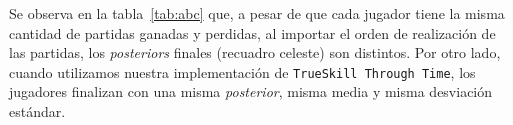 \documentclass[11pt,twoside,spanish]{report} %
\begin{document}
\begin{table}[H]
\centering
{}
\caption{\textit{Posteriors} de tres partidas utilizando \texttt{TrueSkill} con jugadores inicializados con una media de $25$ y una incertidumbre de $6$. Se recuadra en celeste el \textit{posterior} final de cada jugador.}
\label{tab:abc}
\end{table}

Se observa en la tabla~\ref{tab:abc} que, a pesar de que cada jugador tiene la misma cantidad de partidas ganadas y perdidas, al importar el orden de realizaci\'on de las partidas, los \textit{posteriors} finales (recuadro celeste) son distintos.
Por otro lado, cuando utilizamos nuestra implementaci\'on de \texttt{TrueSkill Through Time}, los jugadores finalizan con una misma \textit{posterior}, misma media y misma desviaci\'on est\'andar.
\end{document}
